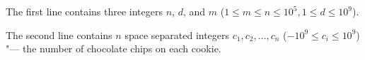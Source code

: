 The first line contains three integers $n$, $d$, and $m$ ($1 \le m \le n \le 10^5, 1 \le d \le 10^9$).

The second line contains $n$ space separated integers $c_1, c_2, \ldots, c_n$ ($-10^9 \le c_i \le 10^9$) "--- the number of chocolate chips on each cookie.
